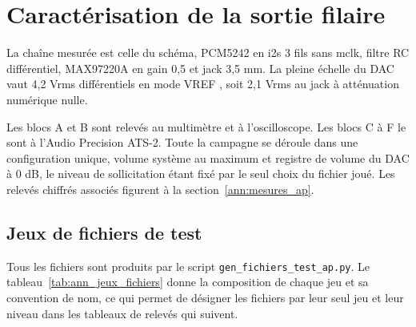\section{Caractérisation de la sortie filaire}
\label{ann:mesures_audio}

La chaîne mesurée est celle du schéma, PCM5242 en \gls{i2s} 3 fils sans \gls{mclk}, filtre RC différentiel, MAX97220A en gain 0,5 et jack 3,5 mm. La pleine échelle du \gls{DAC} vaut 4,2 Vrms différentiels en mode VREF \cite{TI_PCM5242}, soit 2,1 Vrms au jack à atténuation numérique nulle.

Les blocs A et B sont relevés au multimètre et à l'oscilloscope. Les blocs C à F le sont à l'Audio Precision ATS-2. Toute la campagne se déroule dans une configuration unique, volume système au maximum et registre de volume du \gls{DAC} à 0 dB, le niveau de sollicitation étant fixé par le seul choix du fichier joué. Les relevés chiffrés associés figurent à la section~\ref{ann:mesures_ap}.

\subsection{Jeux de fichiers de test}

Tous les fichiers sont produits par le script \texttt{gen\_fichiers\_test\_ap.py}. Le tableau~\ref{tab:ann_jeux_fichiers} donne la composition de chaque jeu et sa convention de nom, ce qui permet de désigner les fichiers par leur seul jeu et leur niveau dans les tableaux de relevés qui suivent.


